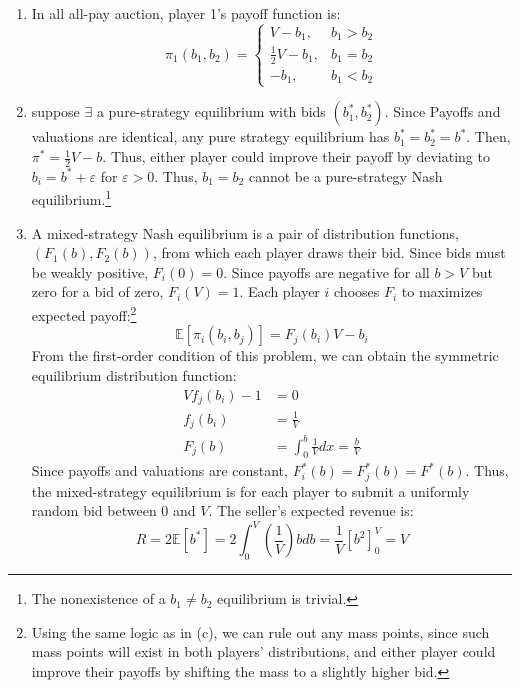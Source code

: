 \documentclass{article}
\newcommand{\E}[1]{\mathbb{E}\left[#1\right]} %
\begin{document}
\begin{enumerate}
\begin{enumerate}
    \item In all all-pay auction, player 1's payoff function is: 
    \[
      \pi_1(b_1,b_2) = \begin{cases}
        V-b_1,&b_1>b_2  \\
        \frac{1}{2}V-b_1,&b_1=b_2 \\
        -b_1,&b_1<b_2
      \end{cases}
    \]

    \item suppose $\exists$ a pure-strategy equilibrium with bids $(b_1^*,b_2^*)$. Since Payoffs and valuations are identical, any pure strategy equilibrium has ${b_1^*=b_2^*=b^*}$. Then, ${\pi^*=\frac{1}{2}V-b}$. Thus, either player could improve their payoff by deviating to ${b_i = b^*+\varepsilon}$ for $\varepsilon>0$. Thus, $b_1=b_2$ cannot be a pure-strategy Nash equilibrium.\footnote{The nonexistence of a $b_1\neq b_2$ equilibrium is trivial.}

    \item A mixed-strategy Nash equilibrium is a pair of distribution functions, $(F_1(b), F_2(b))$, from which each player draws their bid. Since bids must be weakly positive, $F_i(0)=0$. Since payoffs are negative for all ${b>V}$ but zero for a bid of zero, $F_i(V)=1$. Each player $i$ chooses $F_i$ to maximizes expected payoff:\footnote{Using the same logic as in (c), we can rule out any mass points, since such mass points will exist in both players' distributions, and either player could improve their payoffs by shifting the mass to a slightly higher bid.} \[
      \E{\pi_i(b_i,b_j)} = F_j(b_i)V-b_i
    \]
    From the first-order condition of this problem, we can obtain the symmetric equilibrium distribution function:
    \begin{align*}
      Vf_j(b_i)  - 1  &= 0                      \\
      f_j(b_i)        &= \frac{1}{V}            \\
      F_j(b)          &= \int_0^b\frac{1}{V}dx =\frac{b}{V} 
    \end{align*}
    Since payoffs and valuations are constant, ${F_i^*(b)=F_j^*(b)=F^*(b)}$. Thus, the mixed-strategy equilibrium is for each player to submit a uniformly random bid between $0$ and $V$. The seller's expected revenue is: \[
      R = 2\E{b^*} = 2\int_0^V\left(\frac{1}{V}\right)bdb 
        = \frac{1}{V}[b^2]_0^V = V
    \]


\end{enumerate}
\end{enumerate}
\end{document}
